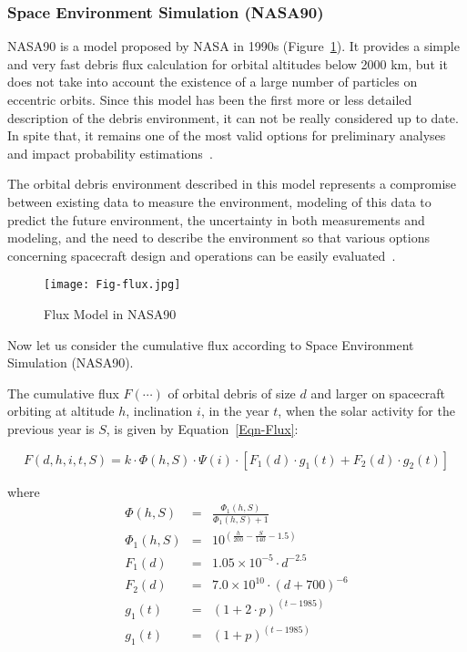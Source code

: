 \documentclass{mcmthesis}
\begin{document}
\subsubsection{Space Environment Simulation (NASA90)}
	
	NASA90 is a model proposed by NASA in 1990s (Figure~\ref{Fig-Flux}). It provides a simple and very fast debris flux calculation for orbital altitudes below 2000 km, but it does not take into account the existence of a large number of particles on eccentric orbits. Since this model has been the first more or less detailed description of the debris environment, it can not be really considered up to date. In spite that, it remains one of the most valid options for preliminary analyses and impact probability estimations~\cite{Andrenucci}.

The orbital debris environment described in this model represents a compromise between existing data to measure the environment, modeling of this data to predict the future environment, the uncertainty in both measurements and modeling, and the need to describe the environment so that various options concerning spacecraft design and operations can be easily evaluated~\cite{flux}.

	\begin{figure}[htbp]
		\centering
		\texttt{[image: Fig-flux.jpg]}
		\caption{Flux Model in NASA90}
		\label{Fig-Flux}
	\end{figure}

    Now let us consider the cumulative flux according to Space Environment Simulation (NASA90).

	The cumulative flux $F(\cdots)$ of orbital debris of size $d$ and larger on spacecraft orbiting at altitude $h$, inclination $i$, in the year $t$, when the solar activity for the previous year is $S$, is given by Equation~\eqref{Eqn-Flux}:
	
	\begin{equation}\label{Eqn-Flux}
	F(d,h,i,t,S) = k \cdot \Phi(h, S) \cdot \Psi(i) \cdot [ F_1(d) \cdot g_1(t) + F_2(d) \cdot g_2(t) ]
	\end{equation}
	
	where
	\begin{eqnarray*}\label{EqnArr-Flux}
	\Phi(h,S) & = & \frac{\Phi_1(h,S)}{\Phi_1(h, S)+1} \\
	\Phi_1(h, S) & = & 10^{(\frac{h}{200}-\frac{S}{140}-1.5)} \\
	F_1(d) & = & 1.05 \times 10^{-5} \cdot d^{-2.5} \\
	F_2(d) & = & 7.0 \times 10^{10} \cdot (d + 700)^{-6} \\
	g_1(t) & = & (1 + 2 \cdot p)^{(t-1985)} \\
	g_1(t) & = & (1 + p)^{(t-1985)}
	\end{eqnarray*}
\end{document}
